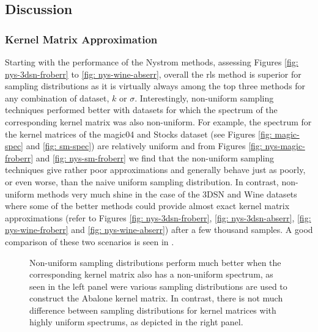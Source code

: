 \subsection{Discussion}\label{Section5.3}

\subsubsection{Kernel Matrix Approximation}\label{Section5.3.1}

Starting with the performance of the Nystrom methods, assessing Figures \ref{fig: nys-3dsn-froberr} to \ref{fig: nys-wine-abserr}, overall the rls method is superior for sampling distributions as it is virtually always among the top three methods for any combination of dataset, $k$ or $\sigma$. Interestingly, non-uniform sampling techniques performed better with datasets for which the spectrum of the corresponding kernel matrix was also non-uniform. For example, the spectrum for the kernel matrices of the magic04 and Stocks dataset (see Figures \ref{fig: magic-spec} and \ref{fig: sm-spec}) are relatively uniform and from Figures \ref{fig: nys-magic-froberr} and \ref{fig: nys-sm-froberr} we find that the non-uniform sampling techniques give rather poor approximations and generally behave just as poorly, or even worse, than the naive uniform sampling distribution. In contrast, non-uniform methods very much shine in the case of the 3DSN and Wine datasets where some of the better methods could provide almost exact kernel matrix approximations (refer to Figures \ref{fig: nys-3dsn-froberr}, \ref{fig: nys-3dsn-abserr}, \ref{fig: nys-wine-froberr} and \ref{fig: nys-wine-abserr}) after a few thousand samples. A good comparison of these two scenarios is seen in .

\begin{figure}[ht]
    \centering
    \caption{Non-uniform sampling distributions perform much better when the corresponding kernel matrix also has a non-uniform spectrum, as seen in the left panel were various sampling distributions are used to construct the Abalone kernel matrix. In contrast, there is not much difference between sampling distributions for kernel matrices with highly uniform spectrums, as depicted in the right panel.}
    \label{fig: nys-uni-vs-nonuni}
\end{figure}

